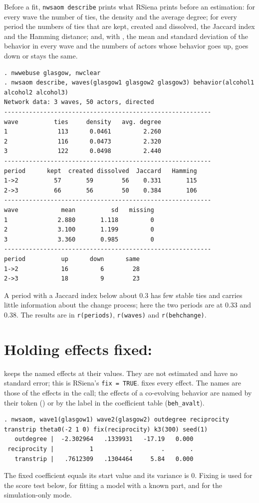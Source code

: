Before a fit, \texttt{nwsaom describe} prints what RSiena prints before an estimation: for every wave the number of ties, the density and the average degree; for every period the numbers of ties that are kept, created and dissolved, the Jaccard index and the Hamming distance; and, with , the mean and standard deviation of the behavior in every wave and the numbers of actors whose behavior goes up, goes down or stays the same.
\begin{lstlisting}
. nwwebuse glasgow, nwclear
. nwsaom describe, waves(glasgow1 glasgow2 glasgow3) behavior(alcohol1 alcohol2 alcohol3)
Network data: 3 waves, 50 actors, directed
----------------------------------------------------------
wave          ties     density   avg. degree
1              113      0.0461         2.260
2              116      0.0473         2.320
3              122      0.0498         2.440
----------------------------------------------------------
period      kept  created dissolved  Jaccard   Hamming
1->2          57       59        56    0.331       115
2->3          66       56        50    0.384       106
----------------------------------------------------------
wave            mean          sd   missing
1              2.880       1.118         0
2              3.100       1.199         0
3              3.360       0.985         0
----------------------------------------------------------
period          up      down      same
1->2            16         6        28
2->3            18         9        23
\end{lstlisting}
A period with a Jaccard index below about 0.3 has few stable ties and carries little information about the change process; here the two periods are at 0.33 and 0.38. The results are in \texttt{r(periods)}, \texttt{r(waves)} and \texttt{r(behchange)}.

\section{Holding effects fixed: }

 keeps the named effects at their  values. They are not estimated and have no standard error; this is RSiena's \texttt{fix = TRUE}.  fixes every effect. The names are those of the effects in the call; the effects of a co-evolving behavior are named by their token () or by the label in the coefficient table (\texttt{beh\_avalt}).
\begin{lstlisting}
. nwsaom, wave1(glasgow1) wave2(glasgow2) outdegree reciprocity transtrip theta0(-2 1 0) fix(reciprocity) k3(300) seed(1)
   outdegree |  -2.302964   .1339931   -17.19   0.000
 reciprocity |          1          .        .       .
   transtrip |   .7612309   .1304464     5.84   0.000
\end{lstlisting}
The fixed coefficient equals its start value and its variance is 0. Fixing is used for the score test below, for fitting a model with a known part, and for the simulation-only mode.

